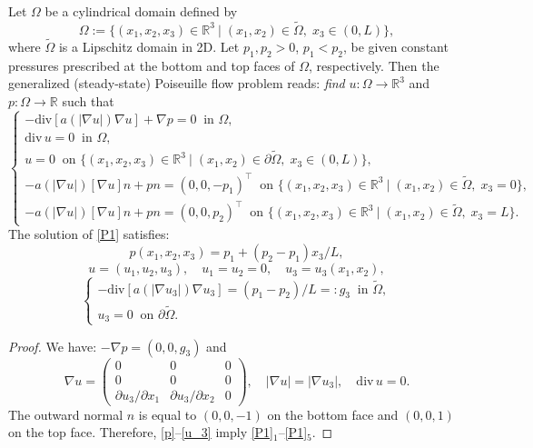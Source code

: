 \documentclass[12pt]{article}
\numberwithin{equation}{section}
\begin{document}
Let $\Omega$ be a cylindrical domain defined by 
$$\Omega:=\{(x_1,x_2,x_3)\in\mathbb R^3\ |\; (x_1,x_2)\in\widetilde\Omega,\;x_3\in(0,L)\},$$
where $\widetilde\Omega$ is a Lipschitz domain in 2D. Let $p_1, p_2>0$, $p_1<p_2$, be given constant pressures prescribed at the bottom and top faces of $\Omega$, respectively. Then the generalized (steady-state) Poiseuille flow problem reads: \textit{find} $u\colon\Omega\rightarrow\mathbb R^3$ and $p\colon\Omega\rightarrow\mathbb R$ such that
\begin{equation}
\left\{\begin{array}{l}
	-\mathrm{div}[a(|\nabla u|)\nabla u]+\nabla p=0\;\;\mbox{in }\Omega,\\
	\mathrm{div}\,u=0\;\;\mbox{in }\Omega,\\
	u=0 \;\;\mbox{on }\{(x_1,x_2,x_3)\in\mathbb R^3\ |\; (x_1,x_2)\in\partial\widetilde\Omega,\;x_3\in(0,L)\},\\
	-a(|\nabla u|)[\nabla u] n+pn=(0,0,-p_1)^\top \;\;\mbox{on }\{(x_1,x_2,x_3)\in\mathbb R^3\ |\; (x_1,x_2)\in\widetilde\Omega,\;x_3=0\},\\
	-a(|\nabla u|)[\nabla u] n+pn=(0,0,p_2)^\top \;\;\mbox{on }\{(x_1,x_2,x_3)\in\mathbb R^3\ |\; (x_1,x_2)\in\widetilde\Omega,\;x_3=L\}.
\end{array}
\right.
\label{P1}
\end{equation}
The solution of \eqref{P1} satisfies: 
\begin{equation}
p(x_1,x_2,x_3)=p_1+(p_2-p_1)x_3/L,
\label{p}
\end{equation}
\begin{equation}
u=(u_1,u_2,u_3),\quad u_1=u_2=0, \quad u_3=u_3(x_1,x_2),
\label{u}
\end{equation}
\begin{equation}
	\left\{\begin{array}{c}
		-\mathrm{div}[a(|\nabla u_3|)\nabla u_3]=(p_1-p_2)/L=:g_3\;\;\mbox{in }\widetilde\Omega,\\
		u_3=0 \;\;\mbox{on }\partial\widetilde\Omega.
	\end{array}
	\right.
\label{u_3}
\end{equation}

\begin{proof}
We have: $-\nabla p=(0,0,g_3)$ and
$$\nabla u=\left(
\begin{array}{ccc}
0 & 0 & 0\\
0 & 0 & 0\\
\partial u_3/\partial x_1 & \partial u_3/\partial x_2 & 0
\end{array}
\right),\quad |\nabla u|=|\nabla u_3|,\quad \mathrm{div}\,u=0.$$
The outward normal $n$ is equal to $(0,0,-1)$ on the bottom face and $(0,0,1)$ on the top face. Therefore, \eqref{p}--\eqref{u_3} imply \eqref{P1}$_1$--\eqref{P1}$_5$. 
\end{proof}
\end{document}
